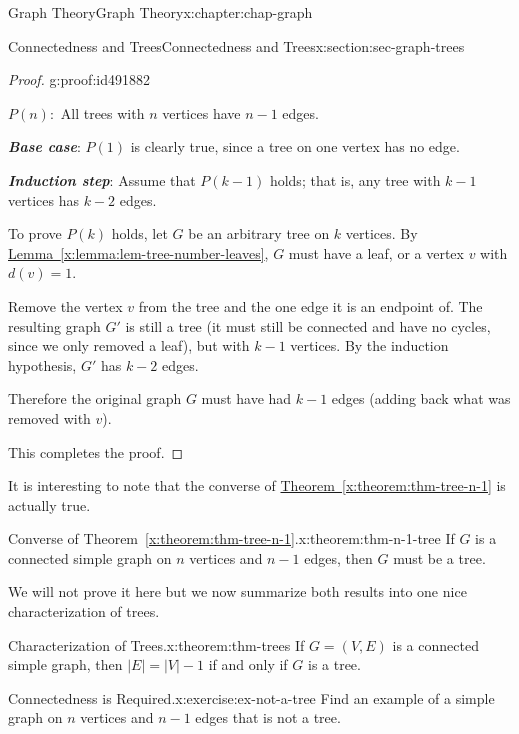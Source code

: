 \documentclass[oneside,10pt,]{book}
\newcommand{\xreffont}{\relax}
\newcommand{\alert}[1]{\textbf{\textit{#1}}}
\numberwithin{equation}{section}
\begin{document}
\begin{chapterptx}{Graph Theory}{}{Graph Theory}{}{}{x:chapter:chap-graph}
\begin{sectionptx}{Connectedness and Trees}{}{Connectedness and Trees}{}{}{x:section:sec-graph-trees}
\begin{proof}{}{g:proof:id491882}
\begin{sidebyside}{1}{0.125}{0.125}{0}
\begin{sbspanel}{0.75}
\(P(n):\) All trees with \(n\) vertices have \(n-1\) edges.%
\end{sbspanel}%
\end{sidebyside}%
\par
\alert{Base case}: \(P(1)\) is clearly true, since a tree on one vertex has no edge.%
\par
\alert{Induction step}: Assume that \(P(k-1)\) holds; that is, any tree with \(k-1\) vertices has \(k-2\) edges.%
\par
To prove \(P(k)\) holds, let \(G\) be an arbitrary tree on \(k\) vertices. By \hyperref[x:lemma:lem-tree-number-leaves]{Lemma~{\xreffont\ref{x:lemma:lem-tree-number-leaves}}}, \(G\) must have a leaf, or a vertex \(v\) with \(d(v) = 1\).%
\par
Remove the vertex \(v\) from the tree and the one edge it is an endpoint of. The resulting graph \(G'\) is still a tree (it must still be connected and have no cycles, since we only removed a leaf), but with \(k-1\) vertices. By the induction hypothesis, \(G'\) has \(k-2\) edges.%
\par
Therefore the original graph \(G\) must have had \(k-1\) edges (adding back what was removed with \(v\)).%
\par
This completes the proof.%
\end{proof}
It is interesting to note that the converse of \hyperref[x:theorem:thm-tree-n-1]{Theorem~{\xreffont\ref{x:theorem:thm-tree-n-1}}} is actually true.%
\begin{theorem}{Converse of Theorem~{\xreffont\ref*{x:theorem:thm-tree-n-1}}.}{}{x:theorem:thm-n-1-tree}%
If \(G\) is a connected simple graph on \(n\) vertices and \(n-1\) edges, then \(G\) must be a tree.%
\end{theorem}
We will not prove it here but we now summarize both results into one nice characterization of trees.%
\begin{theorem}{Characterization of Trees.}{}{x:theorem:thm-trees}%
If \(G = (V,E)\) is a connected simple graph, then \(|E| = |V| - 1\) if and only if \(G\) is a tree.%
\end{theorem}
\begin{inlineexercise}{Connectedness is Required.}{x:exercise:ex-not-a-tree}%
Find an example of a simple graph on \(n\) vertices and \(n-1\) edges that is not a tree.%
\end{inlineexercise}
\end{sectionptx}
%
%
\typeout{************************************************}
\typeout{************************************************}

\end{chapterptx}
\end{document}
